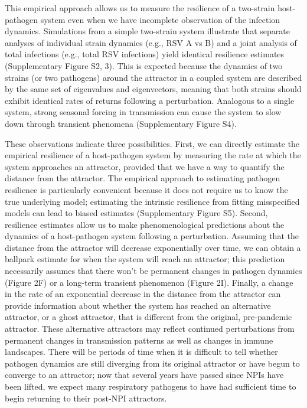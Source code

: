 \documentclass[12pt]{article}
\begin{document}
This empirical approach allows us to measure the resilience of a two-strain host-pathogen system even when we have incomplete observation of the infection dynamics.
Simulations from a simple two-strain system illustrate that separate analyses of individual strain dynamics (e.g., RSV A vs B) and a joint analysis of total infections (e.g., total RSV infections) yield identical resilience estimates (Supplementary Figure S2, 3).
This is expected because the dynamics of two strains (or two pathogens) around the attractor in a coupled system are described by the same set of eigenvalues and eigenvectors, meaning that both strains should exhibit identical rates of returns following a perturbation.
Analogous to a single system, strong seasonal forcing in transmission can cause the system to slow down through transient phenomena (Supplementary Figure S4).

These observations indicate three possibilities.
First, we can directly estimate the empirical resilience of a host-pathogen system by measuring the rate at which the system approaches an attractor, provided that we have a way to quantify the distance from the attractor.
The empirical approach to estimating pathogen resilience is particularly convenient because it does not require us to know the true underlying model;
estimating the intrinsic resilience from fitting misspecified models can lead to biased estimates (Supplementary Figure S5).
Second, resilience estimates allow us to make phenomenological predictions about the dynamics of a host-pathogen system following a perturbation.
Assuming that the distance from the attractor will decrease exponentially over time, we can obtain a ballpark estimate for when the system will reach an attractor;
this prediction necessarily assumes that there won't be permanent changes in pathogen dynamics (Figure 2F) or a long-term transient phenomenon (Figure 2I).
Finally, a change in the rate of an exponential decrease in the distance from the attractor can provide information about whether the system has reached an alternative attractor, or a ghost attractor, that is different from the original, pre-pandemic attractor.
These alternative attractors may reflect continued perturbations from permanent changes in transmission patterns as well as changes in immune landscapes.
There will be periods of time when it is difficult to tell whether pathogen dynamics are still diverging from its original attractor or have begun to converge to an attractor; 
now that several years have passed since NPIs have been lifted, we expect many respiratory pathogens to have had sufficient time to begin returning to their post-NPI attractors.
\end{document}
